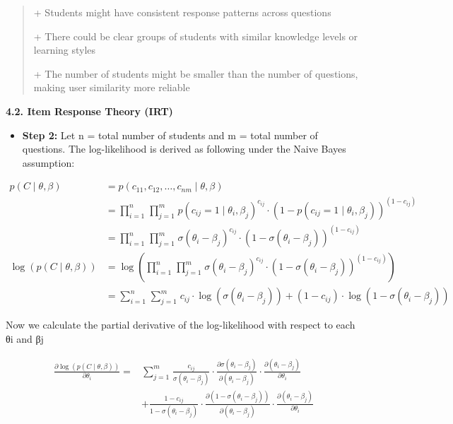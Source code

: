 \begin{quote}
+ Students might have consistent response patterns across questions

+ There could be clear groups of students with similar knowledge levels
or learning styles

+ The number of students might be smaller than the number of questions,
making user similarity more reliable
\end{quote}

\textbf{4.2. Item Response Theory (IRT)}

\begin{itemize}
\item
  \textbf{Step 2:} Let n = total number of students and m = total number
  of questions. The log-likelihood is derived as following under the
  Naive Bayes assumption:
\end{itemize}

\[\begin{aligned}
p(C \mid \theta,\beta) & = p\left( c_{11},c_{12},\ldots,c_{nm} \mid \theta,\beta \right) \\
 & = \prod_{i = 1}^{n}\mspace{2mu}\prod_{j = 1}^{m}\mspace{2mu} p\left( c_{ij} = 1 \mid \theta_{i},\beta_{j} \right)^{c_{ij}} \cdot \left( 1 - p\left( c_{ij} = 1 \mid \theta_{i},\beta_{j} \right) \right)^{\left( 1 - c_{ij} \right)} \\
 & = \prod_{i = 1}^{n}\mspace{2mu}\prod_{j = 1}^{m}\mspace{2mu}\sigma\left( \theta_{i} - \beta_{j} \right)^{c_{ij}} \cdot \left( 1 - \sigma\left( \theta_{i} - \beta_{j} \right) \right)^{\left( 1 - c_{ij} \right)} \\
\log(p(C \mid \theta,\beta)) & = \log\left( \prod_{i = 1}^{n}\mspace{2mu}\prod_{j = 1}^{m}\mspace{2mu}\sigma\left( \theta_{i} - \beta_{j} \right)^{c_{ij}} \cdot \left( 1 - \sigma\left( \theta_{i} - \beta_{j} \right) \right)^{\left( 1 - c_{ij} \right)} \right) \\
 & = \sum_{i = 1}^{n}\mspace{2mu}\sum_{j = 1}^{m}\mspace{2mu} c_{ij} \cdot \log\left( \sigma\left( \theta_{i} - \beta_{j} \right) \right) + \left( 1 - c_{ij} \right) \cdot \log\left( 1 - \sigma\left( \theta_{i} - \beta_{j} \right) \right)
\end{aligned}\]

Now we calculate the partial derivative of the log-likelihood with
respect to each θi and βj

\[\begin{matrix}
\frac{\partial\log(p(C \mid \theta,\beta))}{\partial\theta_{i}} = & \sum_{j = 1}^{m}\mspace{2mu}\frac{c_{ij}}{\sigma\left( \theta_{i} - \beta_{j} \right)} \cdot \frac{\partial\sigma\left( \theta_{i} - \beta_{j} \right)}{\partial\left( \theta_{i} - \beta_{j} \right)} \cdot \frac{\partial\left( \theta_{i} - \beta_{j} \right)}{\partial\theta_{i}} \\
 & + \frac{1 - c_{ij}}{1 - \sigma\left( \theta_{i} - \beta_{j} \right)} \cdot \frac{\partial\left( 1 - \sigma\left( \theta_{i} - \beta_{j} \right) \right)}{\partial\left( \theta_{i} - \beta_{j} \right)} \cdot \frac{\partial\left( \theta_{i} - \beta_{j} \right)}{\partial\theta_{i}} \\
 & \\
 & 
\end{matrix}\]

